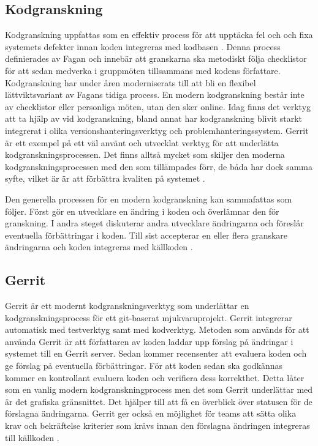\subsection{Kodgranskning}
Kodgranskning uppfattas som en effektiv process för att upptäcka fel och och fixa systemets defekter innan koden integreras med kodbasen \cite{mcintosh2014impact}. Denna process definierades av Fagan \cite{fagan1999design} och innebär att granskarna ska metodiskt följa checklistor för att sedan medverka i gruppmöten tillsammans med kodens författare. Kodgranskning har under åren moderniserats till att bli en flexibel lättviktsvariant av Fagans tidiga process. En modern kodgranskning består inte av checklistor eller personliga möten, utan den sker online. Idag finns det verktyg att ta hjälp av vid kodgranskning, bland annat har kodgranskning blivit starkt integrerat i olika versionshanteringsverktyg och problemhanteringssystem. Gerrit är ett exempel på ett väl använt och utvecklat verktyg för att underlätta kodgranskningsprocessen. Det finns alltså mycket som skiljer den moderna kodgranskningsprocessen med den som tillämpades förr, de båda har dock samma syfte, vilket är är att förbättra kvaliten på systemet \cite{shimagaki2016study}. 

Den generella processen för en modern kodgranskning kan sammafattas som följer. Först gör en utvecklare en ändring i koden och överlämnar den för granskning. I andra steget diskuterar andra utvecklare ändringarna och föreslår eventuella förbättringar i koden. Till sist accepterar en eller flera granskare ändringarna och koden integreras med källkoden \cite{kitagawa2016code}.

\subsection{Gerrit}
Gerrit är ett modernt kodgranskningsverktyg som underlättar en kodgranskningsprocess för ett git-baserat mjukvaruprojekt. Gerrit integrerar automatisk med testverktyg samt med kodverktyg. Metoden som används för att använda Gerrit är att författaren av koden laddar upp förslag på ändringar i systemet till en Gerrit server. Sedan kommer recensenter att evaluera koden och ge förslag på eventuella förbättringar. För att koden sedan ska godkännas kommer en kontrollant evaluera koden och verifiera dess korrekthet. Detta låter som en vanlig modern kodgranskningprocess men det som Gerrit underlättar med är det grafiska gränsnittet. Det hjälper till att få en överblick över statusen för de förslagna ändringarna. Gerrit ger också en möjlighet för teams att sätta olika krav och bekräftelse kriterier som krävs innan den förslagna ändringen integreras till källkoden \cite{mcintosh2014impact}.

